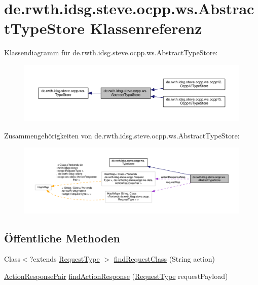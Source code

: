 \hypertarget{classde_1_1rwth_1_1idsg_1_1steve_1_1ocpp_1_1ws_1_1_abstract_type_store}{\section{de.\-rwth.\-idsg.\-steve.\-ocpp.\-ws.\-Abstract\-Type\-Store Klassenreferenz}
\label{classde_1_1rwth_1_1idsg_1_1steve_1_1ocpp_1_1ws_1_1_abstract_type_store}
}


Klassendiagramm für de.\-rwth.\-idsg.\-steve.\-ocpp.\-ws.\-Abstract\-Type\-Store\-:\nopagebreak
\begin{figure}[H]
\begin{center}
\leavevmode
\includegraphics[width=350pt]{classde_1_1rwth_1_1idsg_1_1steve_1_1ocpp_1_1ws_1_1_abstract_type_store__inherit__graph}
\end{center}
\end{figure}


Zusammengehörigkeiten von de.\-rwth.\-idsg.\-steve.\-ocpp.\-ws.\-Abstract\-Type\-Store\-:\nopagebreak
\begin{figure}[H]
\begin{center}
\leavevmode
\includegraphics[width=350pt]{classde_1_1rwth_1_1idsg_1_1steve_1_1ocpp_1_1ws_1_1_abstract_type_store__coll__graph}
\end{center}
\end{figure}
\subsection*{Öffentliche Methoden}
\begin{DoxyCompactItemize}
\item 
Class$<$?extends \hyperlink{interfacede_1_1rwth_1_1idsg_1_1steve_1_1ocpp_1_1_request_type}{Request\-Type} $>$ \hyperlink{classde_1_1rwth_1_1idsg_1_1steve_1_1ocpp_1_1ws_1_1_abstract_type_store_a8dc2b68097f448a5ca6570cff4625f99}{find\-Request\-Class} (String action)
\item 
\hyperlink{classde_1_1rwth_1_1idsg_1_1steve_1_1ocpp_1_1ws_1_1data_1_1_action_response_pair}{Action\-Response\-Pair} \hyperlink{classde_1_1rwth_1_1idsg_1_1steve_1_1ocpp_1_1ws_1_1_abstract_type_store_ae179f4e949bfa7cf3f86fbcb0052f3e3}{find\-Action\-Response} (\hyperlink{interfacede_1_1rwth_1_1idsg_1_1steve_1_1ocpp_1_1_request_type}{Request\-Type} request\-Payload)
\end{DoxyCompactItemize}
